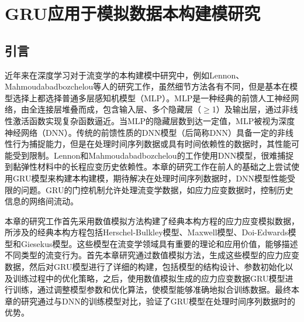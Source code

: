 \chapter{GRU应用于模拟数据本构建模研究}
\section{引言}
近年来在深度学习对于流变学的本构建模中研究中，例如Lennon、Mahmoudabadbozchelou等人的研究工作，虽然细节方法各有不同，但是基本在模型选择上都选择普通多层感知机模型（MLP）\cite{lennonScientificMachineLearning2023a,mahmoudabadbozchelouDatadrivenPhysicsinformedConstitutive2021}。MLP是一种经典的前馈人工神经网络，由全连接层堆叠而成，包含输入层、多个隐藏层（$\geqslant$1）及输出层，通过非线性激活函数实现复杂函数逼近。当MLP的隐藏层数到达一定值，MLP被视为深度神经网络（DNN）。传统的前馈性质的DNN模型（后简称DNN）具备一定的非线性行为捕捉能力，但是在处理时间序列数据或具有时间依赖性的数据时，其性能可能受到限制。Lennon和Mahmoudabadbozchelou的工作使用DNN模型，很难捕捉到黏弹性材料中的长程应变历史依赖性。本章的研究工作在前人的基础之上尝试使用GRU模型来构建本构建模，期待解决在处理时间序列数据时，DNN模型性能受限的问题。GRU的门控机制允许处理流变学数据，如应力应变数据时，控制历史信息的网络间流动。

本章的研究工作首先采用数值模拟方法构建了经典本构方程的应力应变模拟数据，所涉及的经典本构方程包括Herschel-Bulkley模型、Maxwell模型、Doi-Edwards模型和Giesekus模型。这些模型在流变学领域具有重要的理论和应用价值，能够描述不同类型的流变行为。首先本章研究通过数值模拟方法，生成这些模型的应力应变数据，然后对GRU模型进行了详细的构建，包括模型的结构设计、参数初始化以及训练过程中的优化策略，之后，使用数值模拟生成的应力应变数据GRU模型进行训练，通过调整模型参数和优化算法，使模型能够准确地拟合训练数据。最终本章的研究通过与DNN的训练模型对比，验证了GRU模型在处理时间序列数据时的优势。

